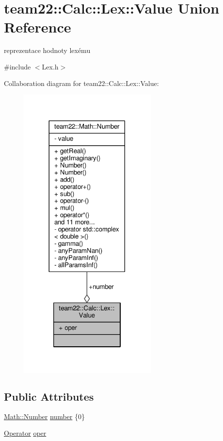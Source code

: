 \hypertarget{unionteam22_1_1_calc_1_1_lex_1_1_value}{}\section{team22\+:\+:Calc\+:\+:Lex\+:\+:Value Union Reference}
\label{unionteam22_1_1_calc_1_1_lex_1_1_value}


reprezentace hodnoty lexému  




{\ttfamily \#include $<$Lex.\+h$>$}



Collaboration diagram for team22\+:\+:Calc\+:\+:Lex\+:\+:Value\+:
\nopagebreak
\begin{figure}[H]
\begin{center}
\leavevmode
\includegraphics[width=197pt]{unionteam22_1_1_calc_1_1_lex_1_1_value__coll__graph}
\end{center}
\end{figure}
\subsection*{Public Attributes}
\begin{DoxyCompactItemize}
\item 
\hyperlink{classteam22_1_1_math_1_1_number}{Math\+::\+Number} \hyperlink{unionteam22_1_1_calc_1_1_lex_1_1_value_a86e2e3ea0c887ca50885bcdb8f1ec5ce}{number} \{0\}
\item 
\hyperlink{classteam22_1_1_calc_1_1_lex_a61d29fc4878a3b36d2de2f13c56ed932}{Operator} \hyperlink{unionteam22_1_1_calc_1_1_lex_1_1_value_ade46fa860d495ce4d431d3934210579d}{oper}
\end{DoxyCompactItemize}


